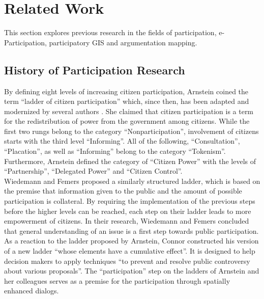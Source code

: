 \section{Related Work}
\label{chap:related_work}
This section explores previous research in the fields of participation, e-Participation, participatory GIS and argumentation mapping.%



\subsection{History of Participation Research}
By defining eight levels of increasing citizen participation, Arnstein \cite{Arnstein1969_citizen_participation} coined the term ``ladder of citizen participation'' which, since then, has been adapted and modernized by several authors \cite{Connor1988_new_ladder,carver2003future,Collins2009_social_learning,you2009_participatory_map_based,Cai2009_spatial_annotation_deliberation,Macintosh2004_eParticipation_characterization,Schlossberg2005_PPGIS}. She claimed that citizen participation is a term for the redistribution of power from the government among citizens. While the first two rungs belong to the category ``Nonparticipation'', involvement of citizens starts with the third level ``Informing''. All of the following, ``Consultation'', ``Placation'', as well as ``Informing'' belong to the category ``Tokenism''. Furthermore, Arnstein defined the category of ``Citizen Power'' with the levels of ``Partnership'', ``Delegated Power'' and ``Citizen Control''.\\
Wiedemann and Femers \cite{Wiedemann1993355} proposed a similarly structured ladder, which is based on the premise that information given to the public and the amount of possible participation is collateral. By requiring the implementation of the previous steps before the higher levels can be reached, each step on their ladder leads to more empowerment of citizens. In their research, Wiedemann and Femers concluded that general understanding of an issue is a first step towards public participation.\\
As a reaction to the ladder proposed by Arnstein, Connor \cite{Connor1988_new_ladder} constructed his version of a new ladder ``whose elements have a cumulative effect''. It is designed to help decision makers to apply techniques ``to prevent and resolve public controversy about various proposals''. The ``participation'' step on the ladders of Arnstein and her colleagues serves as a premise for the participation through spatially enhanced dialogs.%

